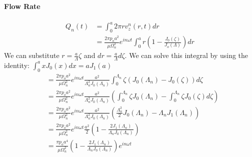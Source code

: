 \documentclass[11pt,letterpaper]{article}
\begin{document}
\paragraph{Flow Rate}
\begin{align*}
    Q_n(t) &= \int_0^a 2 \pi r v_{z}^n(r,t) dr\\
           &= \frac{2 \pi p_o a^2}{\mu \Omega_n^2} e^{i n \omega t} \int_0^{a} r \left(1 - \frac{J_0(\zeta)}{J_o(\Lambda)} \right) dr
\end{align*}
We can substitute $r = \frac{a}{\Lambda} \zeta$ and $dr = \frac{a}{\Lambda} d \zeta$.  We can solve this integral by using the identity: $\int_0^a x J_0(x) dx = a J_1(a)$
\begin{align*}
           &= \frac{2 \pi p_o a^2}{\mu \Omega_n^2} e^{i n \omega t} \frac{a^2}{\Lambda_n^2 J_0(\Lambda_n)} \int_0^{\Lambda_n} \zeta \left(J_0(\Lambda_n) - J_0(\zeta) \right) d \zeta\\
           &= \frac{2 \pi p_o a^2}{\mu \Omega_n^2} e^{i n \omega t} \frac{a^2}{\Lambda_n^2 J_0(\Lambda_n)} \left(\int_0^{\Lambda_n} \zeta J_0(\Lambda_n) - \int_0^{\Lambda_n}\zeta J_0(\zeta) d \zeta \right)\\
           &= \frac{2 \pi p_o a^2}{\mu \Omega_n^2} e^{i n \omega t} \frac{a^2}{\Lambda_n^2 J_0(\Lambda_n)} \left(\frac{\Lambda_n^2}{2} J_0(\Lambda_n) - \Lambda_n J_1(\Lambda_n) \right)\\
           &= \frac{2 \pi p_o a^2}{\mu \Omega_n^2} e^{i n \omega t} \frac{a^2}{2} \left(1 - \frac{2 J_1(\Lambda_n)}{\Lambda_n J_0(\Lambda_n)}\right)\\
           &= \frac{\pi p_o a^4}{\mu \Omega_n^2} \left(1 - \frac{2 J_1(\Lambda_n)}{\Lambda_n J_0(\Lambda_n)}\right)e^{i n \omega t} 
\end{align*}
\end{document}
